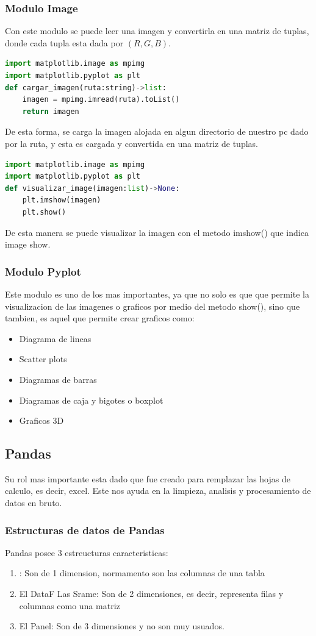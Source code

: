 \documentclass{article}
\begin{document}
\subsubsection{Modulo Image}
Con este modulo se puede leer una imagen y convertirla en una matriz de tuplas, donde cada tupla esta dada por \((R,G,B)\).
\begin{lstlisting}[language=Python, caption= Cargar una imagen]
import matplotlib.image as mpimg
import matplotlib.pyplot as plt
def cargar_imagen(ruta:string)->list:
    imagen = mpimg.imread(ruta).toList()
    return imagen
\end{lstlisting}
De esta forma, se carga la imagen alojada en algun directorio de nuestro pc dado por la ruta, y esta es cargada y convertida en una matriz de tuplas.
\begin{lstlisting}[language=Python, caption= Visualizar una imagen]
import matplotlib.image as mpimg
import matplotlib.pyplot as plt
def visualizar_image(imagen:list)->None:
    plt.imshow(imagen)
    plt.show()
\end{lstlisting}
De esta manera se puede visualizar la imagen con el metodo imshow() que indica image show.
\subsubsection{Modulo Pyplot}
Este modulo es uno de los mas importantes, ya que no solo es que que permite la visualizacion de las imagenes o graficos por medio del metodo show(), sino que tambien, es aquel que permite crear graficos como:
\begin{itemize}
    \item Diagrama de lineas
    \item Scatter plots
    \item Diagramas de barras
    \item Diagramas de caja y bigotes o boxplot
    \item Graficos 3D
\end{itemize}
\subsection{Pandas}
Su rol mas importante esta dado que fue creado para remplazar las hojas de calculo, es decir, excel. Este nos ayuda en la limpieza, analisis y procesamiento de datos en bruto.
\subsubsection{Estructuras de datos de Pandas}
Pandas posee 3 estreucturas caracteristicas:
\begin{enumerate}
    \item: Son de 1 dimension, normamento son las columnas de una tabla
    \item El DataF Las Srame: Son de 2 dimensiones, es decir, representa filas y columnas como una matriz
    \item El Panel: Son de 3 dimensiones y no son muy usuados.
\end{enumerate}
\end{document}
